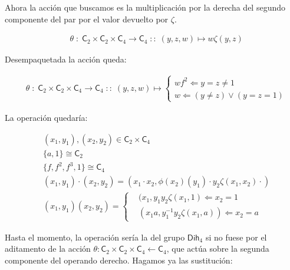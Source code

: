 \documentclass[12pt,a4paper,fleqn,spanish,final,openright]{extbook}
\theoremstyle{definition}
\theoremstyle{remark}
\begin{document}
	Ahora la acción que buscamos es la multiplicación por la derecha del segundo componente del par por el valor devuelto por $\zeta$.

\begin{align*}
&\theta \;:\;
{{{\mathsf{C}}_{2}}{   \times   }{{\mathsf{C}}_{2}}{   \times   }{{\mathsf{C}}_{4}}}
   \longrightarrow
{{\mathsf{C}}_{4}}\;::\;\left(y,z,w\right)    \mapsto w\zeta \left(y,z\right)
\end{align*}


	Desempaquetada la acción queda:


\begin{align*}
&\theta \;:\;
{{{\mathsf{C}}_{2}}{   \times   }{{\mathsf{C}}_{2}}{   \times   }{{\mathsf{C}}_{4}}}
   \longrightarrow
{{\mathsf{C}}_{4}}\;::\;\left(y,z,w\right) \mapsto
\begin{cases}
wf^2    \Leftarrow    {y=z   \neq    1}\\
w    \Leftarrow    (y   \neq    z)   \vee (y=z=1)
\end{cases}
\end{align*}


	La operación quedaría:

\begin{align*}
&(x_1,y_1),(x_2,y_2)   \in \mathsf{C}_{2}   \times   \mathsf{C}_{4}\\
&\{a,1\}   \cong   \mathsf{C}_{2}\\
&\{f,f^2,f^3,1\}   \cong   \mathsf{C}_{4}\\
&(x_1,y_1)⋅(x_2,y_2)=(x_1⋅x_2, \phi (x_2)(y_1)⋅y_2 \zeta (x_1,x_2)⋅)\\
&(x_1,y_1) (x_2,y_2)=
\begin{cases}
&(x_1,y_1 y_2\zeta (x_1,1)    \Leftarrow    x_2 = 1\\
&(x_1 a,y_1^{-1} y_2\zeta (x_1,a))    \Leftarrow    x_2 = a
\end{cases}
\end{align*}

	Hasta el momento, la operación sería la del grupo $\mathsf{Dih}_{4}$ si no fuese por el aditamento de la acción
$\theta : \mathsf{C}_{2}    \times    \mathsf{C}_{2}   \times    \mathsf{C}_{4}    \longleftarrow    \mathsf{C}_{4}$, que actúa sobre
la segunda componente del operando derecho. Hagamos ya las sustitución:
\end{document}
